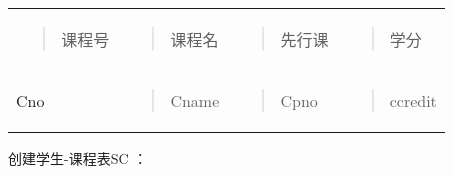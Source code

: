 \documentclass[
]{article}
\begin{document}
\begin{longtable}[]{@{}llll@{}}
\toprule
\endhead
\begin{minipage}[t]{0.22\columnwidth}\raggedright
\begin{quote}
课程号
\end{quote}\strut
\end{minipage} & \begin{minipage}[t]{0.22\columnwidth}\raggedright
\begin{quote}
课程名
\end{quote}\strut
\end{minipage} & \begin{minipage}[t]{0.22\columnwidth}\raggedright
\begin{quote}
先行课
\end{quote}\strut
\end{minipage} & \begin{minipage}[t]{0.22\columnwidth}\raggedright
\begin{quote}
学分
\end{quote}\strut
\end{minipage}\tabularnewline
\begin{minipage}[t]{0.22\columnwidth}\raggedright
Cno\strut
\end{minipage} & \begin{minipage}[t]{0.22\columnwidth}\raggedright
\begin{quote}
Cname
\end{quote}\strut
\end{minipage} & \begin{minipage}[t]{0.22\columnwidth}\raggedright
\begin{quote}
Cpno
\end{quote}\strut
\end{minipage} & \begin{minipage}[t]{0.22\columnwidth}\raggedright
\begin{quote}
ccredit
\end{quote}\strut
\end{minipage}\tabularnewline
\bottomrule
\end{longtable}

创建学生-课程表SC ：
\end{document}

